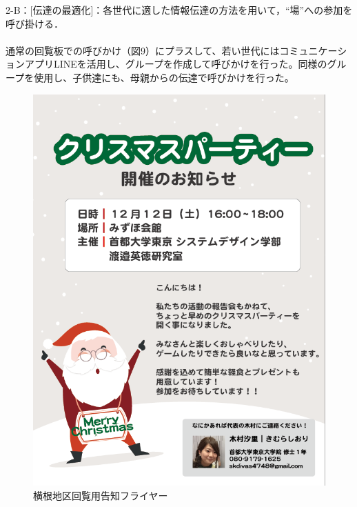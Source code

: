 \documentclass[a4paper]{jsarticle}
\begin{document}
2-B：[伝達の最適化]：各世代に適した情報伝達の方法を用いて，“場”への参加を呼び掛ける．\\\\
通常の回覧板での呼びかけ（図9）にプラスして、若い世代にはコミュニケーションアプリLINEを活用し、グループを作成して呼びかけを行った。同様のグループを使用し、子供達にも、母親からの伝達で呼びかけを行った。

\begin{figure}[H]
  \begin{center}
    \includegraphics[width=0.95\hsize]{./images/05}
    \caption{横根地区回覧用告知フライヤー}
    \label{chirstmas2}
  \end{center}
\end{figure}
\end{document}
